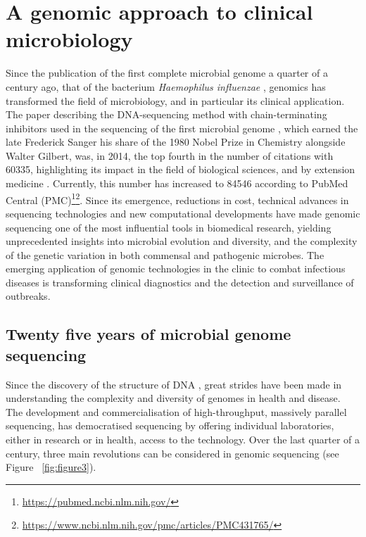 \section{A genomic approach to clinical microbiology} \label{sec:genomics_approach}

Since the publication of the first complete microbial genome a quarter of a century ago, that of the bacterium \textit{Haemophilus influenzae} \citep{hood_dna_1996}, genomics has transformed the field of microbiology, and in particular its clinical application. 
The paper describing the DNA-sequencing method with chain-terminating inhibitors used in the sequencing of the first microbial genome \citep{sanger_dna_1977}, which earned the late Frederick Sanger his share of the 1980 Nobel Prize in Chemistry alongside Walter Gilbert, was, in 2014, the top fourth in the number of citations with 60335, highlighting its impact in the field of biological sciences, and by extension medicine \citep{van_noorden_top_2014}. 
Currently, this number has increased to 84546 according to PubMed Central\textsuperscript{\small\textregistered} (PMC)\footnote{\url{https://pubmed.ncbi.nlm.nih.gov/}}\footnote{\url{ https://www.ncbi.nlm.nih.gov/pmc/articles/PMC431765/}}. 
Since its emergence, reductions in cost, technical advances in sequencing technologies and new computational developments have made genomic sequencing one of the most influential tools in biomedical research, yielding unprecedented insights into microbial evolution and diversity, and the complexity of the genetic variation in both commensal and pathogenic microbes. 
The emerging application of genomic technologies in the clinic to combat infectious diseases is transforming clinical diagnostics and the detection and surveillance of outbreaks. 

\subsection{Twenty five years of microbial genome sequencing} \label{ssec:sequencing}

Since the discovery of the structure of DNA \citep{watson_molecular_1953}, great strides have been made in understanding the complexity and diversity of genomes in health and disease. 
The development and commercialisation of high-throughput, massively parallel sequencing, has democratised sequencing by offering individual laboratories, either in research or in health, access to the technology. 
Over the last quarter of a century, three main revolutions can be considered in genomic sequencing (see Figure ~\ref{fig:figure3}).

